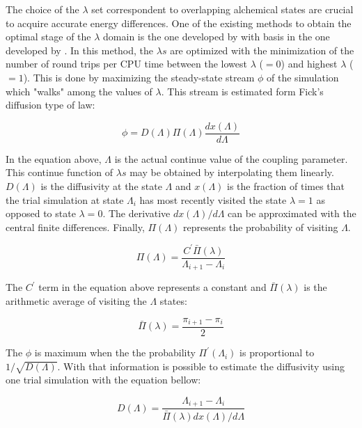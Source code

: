 The choice of the $\lambda$ set correspondent to overlapping alchemical states are crucial to acquire accurate energy differences. One of the existing methods to obtain the optimal stage of the $\lambda$ domain is the one developed by  with basis in the one developed by \cite{trebst2004}. In this method, the $\lambda s$ are optimized with the minimization of the number of round trips per CPU time between the lowest $\lambda$ ($=0$) and highest $\lambda$ ($=1$). This is done by maximizing the steady-state stream $\phi$ of the simulation which "walks" among the values of $\lambda$. This stream is estimated form Fick's diffusion type of law:

\begin{equation}
\phi = D(\Lambda) \Pi (\Lambda) \dfrac{dx(\Lambda)}{d \Lambda}
\label{eqn:stream}
\end{equation}

In the equation above, $\Lambda$ is the actual continue value of the coupling parameter. This continue function of $\lambda s$ may be obtained by interpolating them linearly. $D(\Lambda)$ is the diffusivity at the state $\Lambda$ and $x(\Lambda)$ is the fraction of times that the trial simulation at state $\Lambda_{i}$ has most recently visited the state $\lambda=1$ as opposed to state $\lambda=0$. The derivative ${dx(\Lambda)}/{d \Lambda}$ can be approximated with the central finite differences. Finally, $\Pi (\Lambda)$ represents the probability of visiting $\Lambda$. 

\begin{equation}
\Pi (\Lambda) = \dfrac{C^{'} \bar{\Pi} (\lambda)}{\Lambda_{i+1} - \Lambda_{i}}
\label{eqn:plambda}
\end{equation}

The $C^{'} $ term in the equation above represents a constant and $\bar{\Pi} (\lambda)$ is the arithmetic average of visiting the $\Lambda$ states:

\begin{equation}
\bar{\Pi} (\lambda) = \dfrac{\pi_{i+1} - \pi_{i}}{2}
\label{eqn:barplambda}
\end{equation}

The $\phi$ is maximum when the the probability $\Pi^{'}(\Lambda_{i})$ is proportional to $1/\sqrt{D(\Lambda)}$. With that information is possible to estimate the diffusivity using one trial simulation with the equation bellow:

\begin{equation}
D(\Lambda) = \dfrac{\Lambda_{i+1} - \Lambda_{i}}{\bar{\Pi} (\lambda) {dx(\Lambda)}/{d \Lambda}}
\label{eqn:diff}
\end{equation}

